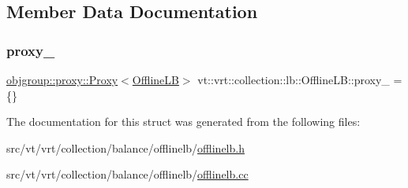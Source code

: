 \subsection{Member Data Documentation}
\mbox{\label{structvt_1_1vrt_1_1collection_1_1lb_1_1_offline_l_b_a38da27cd9b5a0e0e6582f06c07e1f3d5}} 
\subsubsection{\texorpdfstring{proxy\+\_\+}{proxy\_}}
{\footnotesize\ttfamily \hyperlink{structvt_1_1objgroup_1_1proxy_1_1_proxy}{objgroup\+::proxy\+::\+Proxy}$<$\hyperlink{structvt_1_1vrt_1_1collection_1_1lb_1_1_offline_l_b}{Offline\+LB}$>$ vt\+::vrt\+::collection\+::lb\+::\+Offline\+L\+B\+::proxy\+\_\+ = \{\}\hspace{0.3cm}{\ttfamily [private]}}



The documentation for this struct was generated from the following files\+:\begin{DoxyCompactItemize}
\item 
src/vt/vrt/collection/balance/offlinelb/\hyperlink{offlinelb_8h}{offlinelb.\+h}\item 
src/vt/vrt/collection/balance/offlinelb/\hyperlink{offlinelb_8cc}{offlinelb.\+cc}\end{DoxyCompactItemize}
